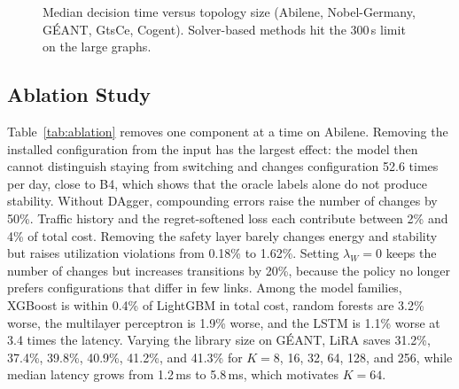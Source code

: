 \documentclass[conference]{IEEEtran}
\begin{document}
\begin{figure}[t]
\centering
{}
\caption{Median decision time versus topology size (Abilene, Nobel-Germany, G\'{E}ANT, GtsCe, Cogent). Solver-based methods hit the 300\,s limit on the large graphs.}
\label{fig:latency}
\end{figure}

\subsection{Ablation Study}\label{sec:ablation}

Table~\ref{tab:ablation} removes one component at a time on Abilene. Removing the installed configuration from the input has the largest effect: the model then cannot distinguish staying from switching and changes configuration 52.6 times per day, close to B4, which shows that the oracle labels alone do not produce stability. Without DAgger, compounding errors raise the number of changes by 50\%. Traffic history and the regret-softened loss each contribute between 2\% and 4\% of total cost. Removing the safety layer barely changes energy and stability but raises utilization violations from 0.18\% to 1.62\%. Setting $\lambda_W=0$ keeps the number of changes but increases transitions by 20\%, because the policy no longer prefers configurations that differ in few links. Among the model families, XGBoost is within 0.4\% of LightGBM in total cost, random forests are 3.2\% worse, the multilayer perceptron is 1.9\% worse, and the LSTM is 1.1\% worse at 3.4 times the latency. Varying the library size on G\'{E}ANT, LiRA saves 31.2\%, 37.4\%, 39.8\%, 40.9\%, 41.2\%, and 41.3\% for $K=8$, 16, 32, 64, 128, and 256, while median latency grows from 1.2\,ms to 5.8\,ms, which motivates $K=64$.
\end{document}
